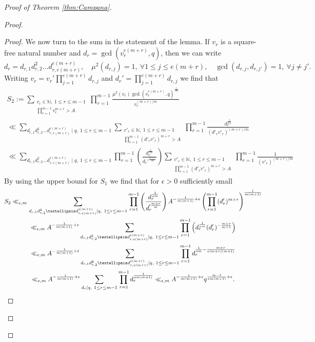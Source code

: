 \documentclass[10pt, a4paper, reqno, english]{amsart}
\theoremstyle{definition}
\numberwithin{theorem}{section}
\numberwithin{equation}{section}
\begin{document}
\begin{proof}[Proof of Theorem \ref{thm:Campana}]
\begin{proof}
\begin{proof}
We now turn to the sum in the statement of the lemma. If $v_r$ is a square-free natural number and $d_r=\gcd(v_r^{e(m+r)},q)$, then we can write 
$$d_r=d_{r,1}d_{r,2}^2\ldots d_{r,e(m+r)}^{e(m+r)},\quad \mu^2(d_{r,j})=1,\ \forall 1\leq j\leq e(m+r),\quad \gcd(d_{r,j},d_{r,j'})=1,\ \forall j\neq j'.$$
Writing $v_r=v_r'\prod_{j=1}^{e(m+r)}d_{r,j}$ and $d_r'=\prod_{j=1}^{e(m+r)}d_{r,j}$ we find that
\begin{gather*}
S_2:=\sum_{\substack{ v_{r}\in \mathbb{N},\ 1\leq r\leq m-1\\\prod_{r=1}^{m-1} v_{r}^{m+r}>A }} \prod_{r=1}^{m-1}\frac{\mu^2( v_{r})\gcd( v_{r}^{e(m+r)},q)^\frac 1{em}}{ v_{r}^{(m+r)/m}} \\
\ll \sum_{d_{r,1}d_{r,2}^2\ldots d_{r,e(m+r)}^{e(m+r)} \mid q,\ 1\leq r\leq m-1} \sum_{\substack{ v'_{r}\in \mathbb{N},\ 1\leq r\leq m-1\\\prod_{r=1}^{m-1} (d'_rv'_{r})^{m+r}>A }} \prod_{r=1}^{m-1}\frac{d_r^\frac 1{em}}{ (d'_rv'_{r})^{(m+r)/m}} \\
\ll \sum_{d_{r,1}d_{r,2}^2\ldots d_{r,e(m+r)}^{e(m+r)} \mid q,\ 1\leq r\leq m-1} \prod_{r=1}^{m-1} \left(\frac{d_r^{\frac{1}{em}}}{d_r'^{\frac{m+r}{m}}}\right) \sum_{\substack{ v'_{r}\in \mathbb{N},\ 1\leq r\leq m-1\\\prod_{r=1}^{m-1} (d'_rv'_{r})^{m+r}>A }} \prod_{r=1}^{m-1}\frac{1}{ (v'_{r})^{(m+r)/m}}
\end{gather*}
By using the upper bound for $S_1$ we find that for $\epsilon >0$ sufficiently small
\begin{gather*}
S_2 \ll_{\epsilon,m} \sum_{d_{r,1}d_{r,2}^2\ldots d_{r,e(m+r)}^{e(m+r)} \mid q,\ 1\leq r\leq m-1} \prod_{r=1}^{m-1} \left(\frac{d_r^{\frac{1}{em}}}{d_r'^{\frac{m+r}{m}}}\right) A^{-\frac{1}{m(m+1)}+\epsilon} \left(\prod_{r=1}^{m-1}(d_r')^{m+r}\right)^{\frac{1}{m(m+1)}} \\
\ll_{\epsilon,m} A^{-\frac{1}{m(m+1)}+\epsilon} \sum_{d_{r,1}d_{r,2}^2\ldots d_{r,e(m+r)}^{e(m+r)} \mid q,\ 1\leq r\leq m-1} \prod_{r=1}^{m-1} \left( d_r^{\frac{1}{em}} (d_r')^{-\frac{m+r}{m+1}}\right)\\
\ll_{\epsilon,m} A^{-\frac{1}{m(m+1)}+\epsilon} \sum_{d_{r,1}d_{r,2}^2\ldots d_{r,e(m+r)}^{e(m+r)} \mid q,\ 1\leq r\leq m-1} \prod_{r=1}^{m-1}  d_{r}^{\frac{1}{em}-\frac{m+r}{e(m+r)(m+1)}}\\
\ll_{\epsilon,m} A^{-\frac{1}{m(m+1)}+\epsilon} \sum_{d_r \mid q,\ 1\leq r\leq m-1} \prod_{r=1}^{m-1} d_{r}^{\frac{1}{em(m+1)}} \ll_{\epsilon,m} A^{-\frac{1}{m(m+1)}+\epsilon} q^{\frac{m-1}{em(m+1)}+\epsilon}.\qedhere
\end{gather*}



\end{proof}
\end{proof}
\end{proof}
\end{document}
